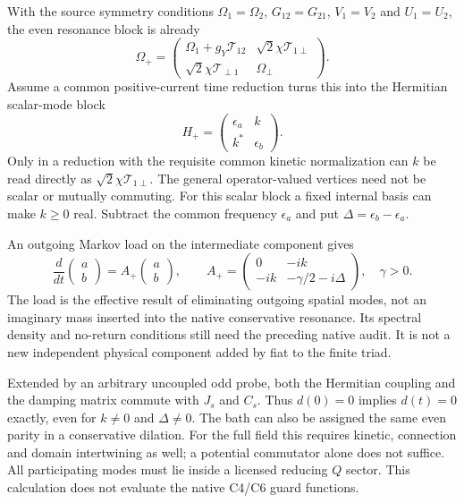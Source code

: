 \documentclass[11pt,a4paper]{article}
\begin{document}
With the source symmetry conditions
$\Omega_1=\Omega_2$, $G_{12}=G_{21}$, $V_1=V_2$ and $U_1=U_2$,
the even resonance block is already
\[
 \Omega_+=\begin{pmatrix}
  \Omega_1+g_Y\mathcal T_{12}&\sqrt2\chi\mathcal T_{1\perp}\\
  \sqrt2\chi\mathcal T_{\perp1}&\Omega_\perp
 \end{pmatrix}.
\]
Assume a common positive-current time reduction turns this into
the Hermitian scalar-mode block
\[
 H_+=\begin{pmatrix}\epsilon_a&k\\k^*&\epsilon_b\end{pmatrix}.
\]
Only in a reduction with the requisite common kinetic normalization
can $k$ be read directly as $\sqrt2\chi\mathcal T_{1\perp}$.
The general operator-valued vertices need not be scalar or mutually
commuting. For this scalar block a fixed internal basis can make
$k\geq0$ real. Subtract the common frequency $\epsilon_a$ and put
$\Delta=\epsilon_b-\epsilon_a$.

An outgoing Markov load on the intermediate component gives
\[
 \frac{d}{dt}\begin{pmatrix}a\\b\end{pmatrix}
 =A_+\begin{pmatrix}a\\b\end{pmatrix},\qquad
 A_+=\begin{pmatrix}0&-ik\\-ik&-\gamma/2-i\Delta\end{pmatrix},
 \quad \gamma>0.
\]
The load is the effective result of eliminating outgoing spatial
modes, not an imaginary mass inserted into the native conservative
resonance. Its spectral density and no-return conditions still
need the preceding native audit. It is not a new independent
physical component added by fiat to the finite triad.

Extended by an arbitrary uncoupled odd probe, both the Hermitian
coupling and the damping matrix commute with $J_s$ and $C_s$.
Thus $d(0)=0$ implies $d(t)=0$ exactly, even for $k\ne0$ and
$\Delta\ne0$. The bath can also be assigned the same even parity
in a conservative dilation. For the full field this requires
kinetic, connection and domain intertwining as well; a potential
commutator alone does not suffice. All participating modes must
lie inside a licensed reducing $Q$ sector. This calculation does
not evaluate the native C4/C6 guard functions.
\end{document}
